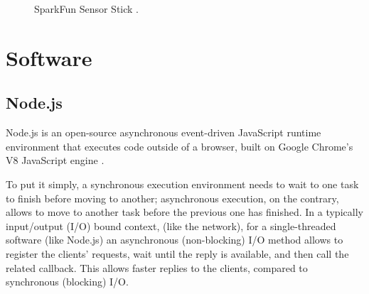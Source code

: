 \begin{center}
	\begin{figure}[ht]
		\caption{SparkFun Sensor Stick \cite{IMU}.}
	\end{figure}
\end{center}

\section{Software}

\subsection{Node.js}
Node.js is an open-source asynchronous event-driven JavaScript runtime environment that executes code outside of a browser, built on Google Chrome's V8 JavaScript engine \cite{Node.js}.

To put it simply, a synchronous execution environment needs to wait to one task to finish before moving to another; asynchronous execution, on the contrary, allows to move to another task before the previous one has finished. In a typically input/output (I/O) bound context, (like the network), for a single-threaded software (like Node.js) an asynchronous (non-blocking) I/O method allows to register the clients' requests, wait until the reply is available, and then call the related callback. This allows faster replies to the clients, compared to synchronous (blocking) I/O.

